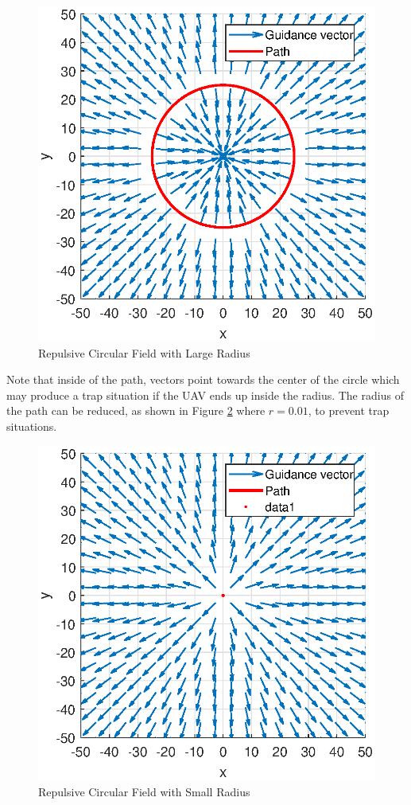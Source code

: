 \documentclass[numbered,pdftex]{ohio-etd}
\begin{document}
\begin{figure}[H]
	\centering
	\includegraphics[width=0.7\linewidth]{Figures/methods/largeRepulsive}
	\caption{Repulsive Circular Field with Large Radius}
	\label{fig:largerepulsive}
\end{figure}

Note that inside of the path, vectors point towards the center of the circle which may produce a trap situation if the UAV ends up inside the radius. The radius of the path can be reduced, as shown in Figure \ref{fig:normalizedrepulsive} where $r=0.01$, to prevent trap situations.


\begin{figure}[H]
	\centering
	\includegraphics[width=0.7\linewidth]{Figures/methods/normalizedRepulsive}
	\caption{Repulsive Circular Field with Small Radius}
	\label{fig:normalizedrepulsive}
\end{figure}
\end{document}
